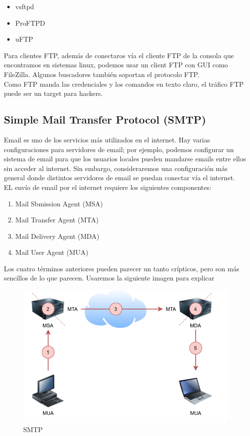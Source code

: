 \documentclass[12pt]{report}
\begin{document}
\begin{itemize}
  \item vsftpd
  \item ProFTPD
  \item uFTP
\end{itemize}

Para clientes FTP, además de conectaros vía el cliente FTP de la consola que encontramos en 
sistemas linux, podemos usar un client FTP con GUI como FileZilla. Algunos buscadores también soportan
el protocolo FTP.\\

Como FTP manda las credenciales y los comandos en texto claro, el tráfico FTP puede ser 
un target para hackers.

\subsection{Simple Mail Transfer Protocol (SMTP)}
Email es uno de los servicios más utilizados en el internet. Hay varias configuraciones
para servidores de email; por ejemplo, podemos configurar un sistema de email para que 
los usuarios locales pueden mandarse emails entre ellos sin acceder al internet.
Sin embargo, consideraremos una configuración más general donde distintos
servidores de email se puedan conectar vía el internet.\\
EL envío de email por el internet requiere los siguientes componentes:
\begin{enumerate}
  \item Mail Sbmission Agent (MSA)
  \item Mail Transfer Agent (MTA)
  \item Mail Delivery Agent (MDA)
  \item Mail User Agent (MUA)
\end{enumerate}
Los cuatro términos anteriores pueden parecer un tanto crípticos, pero son más sencillos 
de lo que parecen. Usaremos la siguiente imagen para explicar

\begin{figure}[h]
\centering
\includegraphics[width=1\textwidth]{SMTP.jpg}
\caption{SMTP}
\end{figure}
\end{document}
